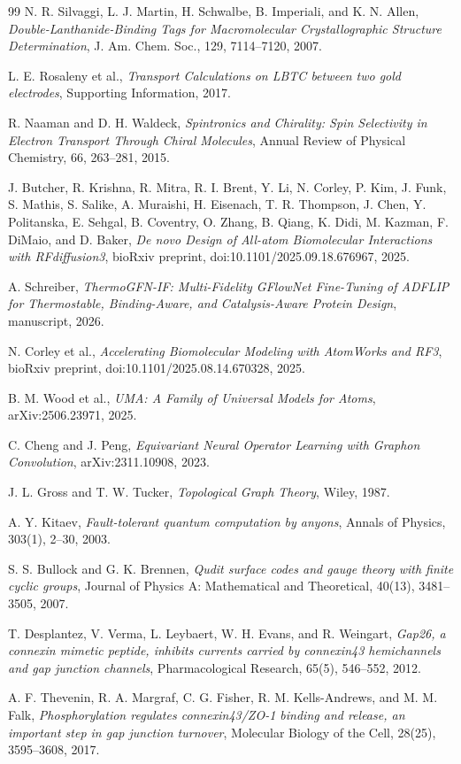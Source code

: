 \documentclass[11pt]{report}
\newcommand{\etal}{et al.}
\theoremstyle{definition}
\begin{document}
\begin{thebibliography}{99}
N. R. Silvaggi, L. J. Martin, H. Schwalbe, B. Imperiali, and K. N. Allen,
\emph{Double-Lanthanide-Binding Tags for Macromolecular Crystallographic Structure Determination},
J. Am. Chem. Soc., 129, 7114--7120, 2007.

L. E. Rosaleny \etal{},
\emph{Transport Calculations on LBTC between two gold electrodes},
Supporting Information, 2017.

R. Naaman and D. H. Waldeck,
\emph{Spintronics and Chirality: Spin Selectivity in Electron Transport Through Chiral Molecules},
Annual Review of Physical Chemistry, 66, 263--281, 2015.

J. Butcher, R. Krishna, R. Mitra, R. I. Brent, Y. Li, N. Corley, P. Kim, J. Funk, S. Mathis, S. Salike, A. Muraishi, H. Eisenach, T. R. Thompson, J. Chen, Y. Politanska, E. Sehgal, B. Coventry, O. Zhang, B. Qiang, K. Didi, M. Kazman, F. DiMaio, and D. Baker,
\emph{De novo Design of All-atom Biomolecular Interactions with RFdiffusion3},
bioRxiv preprint, doi:10.1101/2025.09.18.676967, 2025.

A. Schreiber,
\emph{ThermoGFN-IF: Multi-Fidelity GFlowNet Fine-Tuning of ADFLIP for Thermostable, Binding-Aware, and Catalysis-Aware Protein Design},
manuscript, 2026.

N. Corley \etal{},
\emph{Accelerating Biomolecular Modeling with AtomWorks and RF3},
bioRxiv preprint, doi:10.1101/2025.08.14.670328, 2025.

B. M. Wood \etal{},
\emph{UMA: A Family of Universal Models for Atoms},
arXiv:2506.23971, 2025.

C. Cheng and J. Peng,
\emph{Equivariant Neural Operator Learning with Graphon Convolution},
arXiv:2311.10908, 2023.

J. L. Gross and T. W. Tucker,
\emph{Topological Graph Theory},
Wiley, 1987.

A. Y. Kitaev,
\emph{Fault-tolerant quantum computation by anyons},
Annals of Physics, 303(1), 2--30, 2003.

S. S. Bullock and G. K. Brennen,
\emph{Qudit surface codes and gauge theory with finite cyclic groups},
Journal of Physics A: Mathematical and Theoretical, 40(13), 3481--3505, 2007.

T. Desplantez, V. Verma, L. Leybaert, W. H. Evans, and R. Weingart,
\emph{Gap26, a connexin mimetic peptide, inhibits currents carried by connexin43 hemichannels and gap junction channels},
Pharmacological Research, 65(5), 546--552, 2012.

A. F. Thevenin, R. A. Margraf, C. G. Fisher, R. M. Kells-Andrews, and M. M. Falk,
\emph{Phosphorylation regulates connexin43/ZO-1 binding and release, an important step in gap junction turnover},
Molecular Biology of the Cell, 28(25), 3595--3608, 2017.

\end{thebibliography}
\end{document}
